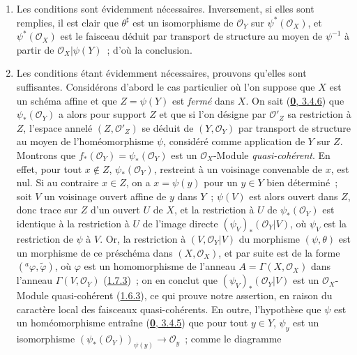 \begin{enumerate}
  \item[\emph{a)}] Les conditions sont évidemment nécessaires. Inversement, si elles
  sont remplies, il est clair que $\theta^\sharp$ est un isomorphisme de
  $\mathscr{O}_Y$ sur $\psi^*(\mathscr{O}_X)$, et
  $\psi^*(\mathscr{O}_X)$ est le faisceau déduit par transport de structure au
  moyen de $\psi^{-1}$ à partir de $\mathscr{O}_X|\psi(Y)$~; d'où la
  conclusion.
  \item[\emph{b)}] Les conditions étant évidemment nécessaires, prouvons qu'elles
  sont suffisantes. Considérons d'abord le cas particulier où l'on suppose que
  $X$ est un schéma affine et que $Z=\psi(Y)$ est \emph{fermé} dans $X$. On
  sait (\hyperref[0.3.4.6-fr]{\textbf{0}, 3.4.6}) que $\psi_*(\mathscr{O}_Y)$ a alors
  pour support $Z$ et que si l'on désigne par $\mathscr{O}'_Z$ sa restriction
  à $Z$, l'espace annelé $(Z,\mathscr{O}'_Z)$ se déduit de
  $(Y,\mathscr{O}_Y)$ par transport de structure au moyen de
  l'homéomorphisme $\psi$, considéré comme application de $Y$ sur $Z$.
  Montrons que $f_*(\mathscr{O}_Y)=\psi_*(\mathscr{O}_Y)$ est un
  $\mathscr{O}_X$-Module \emph{quasi-cohérent}. En effet, pour tout
  $x\notin Z$, $\psi_*(\mathscr{O}_Y)$, restreint à un voisinage convenable de
  $x$, est nul. Si au contraire $x\in Z$, on a $x=\psi(y)$ pour un $y\in Y$
  bien déterminé~; soit $V$ un voisinage ouvert affine de $y$ dans $Y$~;
  $\psi(V)$ est alors ouvert dans $Z$, donc trace sur $Z$ d'un ouvert $U$ de
  $X$, et la restriction à $U$ de $\psi_*(\mathscr{O}_Y)$ est identique à la
  restriction à $U$ de l'image
  directe $(\psi_V)_*(\mathscr{O}_Y|V)$, où $\psi_V$ est la restriction de
  $\psi$ à $V$. Or, la restriction à $(V,\mathscr{O}_Y|V)$ du morphisme
  $(\psi,\theta)$ est un morphisme de ce préschéma dans
  $(X,\mathscr{O}_X)$, et par suite est de la forme
  $({}^a\varphi,\widetilde{\varphi})$, où $\varphi$ est un homomorphisme de
  l'anneau $A=\Gamma(X,\mathscr{O}_X)$ dans l'anneau
  $\Gamma(V,\mathscr{O}_Y)$ (\hyperref[I.1.7.3-fr]{1.7.3})~; on en conclut
  que $(\psi_V)_*(\mathscr{O}_Y|V)$ est un $\mathscr{O}_X$-Module
  quasi-cohérent (\hyperref[I.1.6.3-fr]{1.6.3}), ce qui prouve notre
  assertion, en raison du caractère local des faisceaux quasi-cohérents. En
  outre, l'hypothèse que $\psi$ est un homéomorphisme entraîne
  (\hyperref[0.3.4.5-fr]{\textbf{0}, 3.4.5}) que pour tout $y\in Y$, $\psi_y$ est un
  isomorphisme
  $(\psi_*(\mathscr{O}_Y))_{\psi(y)}\to\mathscr{O}_y$~; comme le diagramme
  \label{I.4.2.2.theta-diagram-fr}

\end{enumerate}
